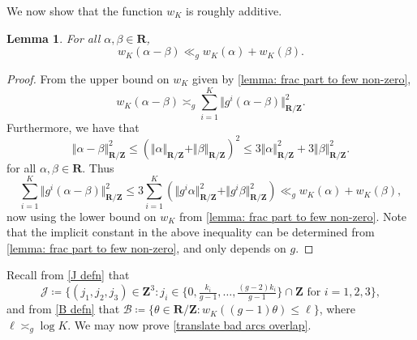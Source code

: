 \documentclass[hidelinks,11pt,reqno]{amsart}
\renewcommand{\leq}{\leqslant}
\newcommand{\Z}{\ensuremath{\mathbf{Z}}}
\newcommand{\R}{\ensuremath{\mathbf{R}}}
\newcommand{\st}{\ensuremath{:}}
\newcommand{\Vertr}{\Vert_{\R/\Z}}
\newcommand{\V}[1]{\Vert #1 \Vertr}
\newtheorem{lemma}[prop]{Lemma}
\theoremstyle{remark}
\begin{document}
We now show that the function $w_{K}$ is roughly additive.
\begin{lemma}\label{wk additive short ver}
    For all $\alpha,\beta \in \R$,
    \[w_{K}(\alpha-\beta)\ll_{g} w_{K}(\alpha)+w_{K}(\beta).\]
\end{lemma}
\begin{proof}
    From the upper bound on $w_{K}$ given by \cref{lemma: frac part to few non-zero}, 
    \[w_{K}(\alpha-\beta)\asymp_{g} \sum_{i=1}^{K}\V{g^{i}(\alpha-\beta)}^{2}.\]
    Furthermore, we have that
    \begin{equation}
        \V{\alpha-\beta}^{2}\leq (\V{\alpha}+\V{\beta})^{2}\leq 3\V{\alpha}^{2}+3\V{\beta}^{2}.
    \end{equation}
    for all $\alpha,\beta \in \R$. Thus
    \[\sum_{i=1}^{K}\V{g^{i}(\alpha-\beta)}^{2}\leq 3\sum_{i=1}^{K}(\V{g^{i}\alpha}^{2}+\V{g^{i}\beta}^{2})\ll_{g}w_{K}(\alpha)+w_{K}(\beta),\]
    now using the lower bound on $w_{K}$ from \cref{lemma: frac part to few non-zero}. Note that the implicit constant in the above inequality can be determined from \cref{lemma: frac part to few non-zero}, and only depends on $g$.
\end{proof}
Recall from \cref{J defn} that  
\[ \mathcal{J}\coloneq\{(j_{1},j_{2},j_{3})\in \Z^{3}\st j_{i}\in \{0,\tfrac{k_{i}}{g-1},\ldots,\tfrac{(g-2)k_{i}}{g-1}\}\cap \Z \textrm{ for }i=1,2,3\},\]
and from \cref{B defn} that $\mathcal{B}\coloneq\{\theta \in \R/\Z\st w_{K}((g-1)\theta)\leq \ell\}$, where $\ell\asymp_{g}\log K$. We may now prove \cref{translate bad arcs overlap}. 
\end{document}
